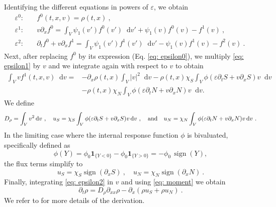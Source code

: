\documentclass[11pt,twoside]{article}
\theoremstyle{nonumberplain}
\DeclareMathOperator{\sign}{sign}
\newcommand*\diff{\mathop{}\!\mathrm{d}}
\begin{document}
\noindent Identifying the different equations in powers of $\varepsilon$, we obtain
\fi
\begin{align}
    \varepsilon^0: & \quad f^0(t,{x},{v})=\rho(t,{x})\ ,\label{eq: epsilon0}\\
    \varepsilon^1: & \quad {v}\partial_x f^0=\int_V\psi_1(v')f^0(v')\diff v'{+}\psi_1(v)f^0(v)-f^1(v)\ ,\label{eq: epsilon1}\\
    \varepsilon^2: & \quad \partial_tf^0+{v}\partial_x f^1 =\int_V\psi_1(v')f^1(v')\diff v'-\psi_1(v)f^1(v)-f^2(v) \ \label{eq: epsilon2}.\
\end{align}
Next, after replacing $f^0$ by its expression (Eq. \eqref{eq: epsilon0}), we multiply \eqref{eq: epsilon1} by ${v}$ and we integrate again with respect to ${v}$ to obtain
\begin{align}
    \int_V vf^1(t,x,v) \diff v=&-\partial_x\rho(t,x)\int_V |v|^2\diff v-\rho(t,x)\chi_S\int_V\phi(\varepsilon\partial_tS+v\partial_xS)v\diff v\nonumber\\ &-\rho(t,x)\chi_N\int_V\phi(\varepsilon\partial_tN+v\partial_xN)v\diff v.\label{eq: mean direction}
\end{align}
We define
\begin{equation}
D_\rho=\int_V v^2 \diff v\ ,\quad u_S=\chi_S\int_V\phi(\varepsilon\partial_tS+v\partial_xS)v\diff v \ ,\quad \textnormal{and}\quad u_N=\chi_N\int_V\phi(\varepsilon\partial_tN+v\partial_xN)v\diff v\ .\label{eq: moment}\end{equation} 
In the limiting case where the internal response function $\phi$ is bivaluated, specifically defined as
\[
\phi(Y) = \phi_0 \mathbf{1}_{\{Y < 0\}} - \phi_0 \mathbf{1}_{\{Y > 0\}} = - \phi_0 \, \sign(Y),
\]
the flux terms simplify to
\begin{equation}
u_S= \chi_S\sign(\partial_x S)\ , \quad u_N=\chi_N \sign(\partial_x N)\ .
\end{equation}
Finally, integrating \eqref{eq: epsilon2} in ${v}$ and using \eqref{eq: moment} we obtain
\[
\partial_t\rho=D_\rho\partial_{xx}\rho-\partial_x(\rho u_S+\rho u_N)\ .
\]
We refer to \cite{emako2015existence,emako2016traveling} for more details of the derivation.
\end{document}
